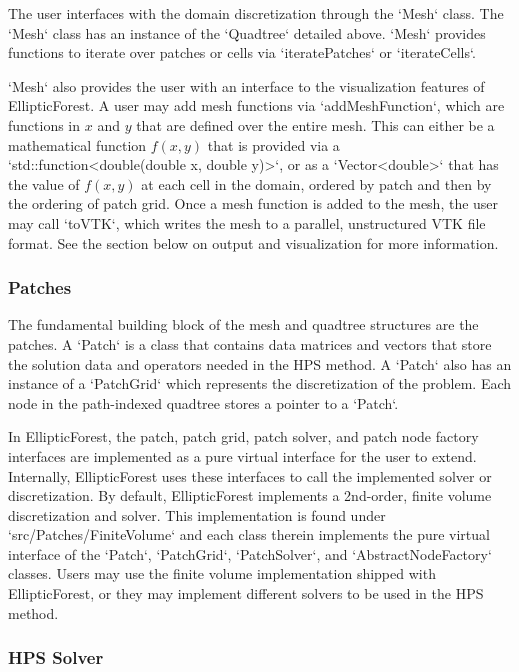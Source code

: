 The user interfaces with the domain discretization through the `Mesh` class. The `Mesh` class has an instance of the `Quadtree` detailed above. `Mesh` provides functions to iterate over patches or cells via `iteratePatches` or `iterateCells`.

`Mesh` also provides the user with an interface to the visualization features of EllipticForest. A user may add mesh functions via `addMeshFunction`, which are functions in $x$ and $y$ that are defined over the entire mesh. This can either be a mathematical function $f(x,y)$ that is provided via a `std::function<double(double x, double y)>`, or as a `Vector<double>` that has the value of $f(x,y)$ at each cell in the domain, ordered by patch and then by the ordering of patch grid. Once a mesh function is added to the mesh, the user may call `toVTK`, which writes the mesh to a parallel, unstructured VTK file format. See the section below on output and visualization for more information.

\subsubsection{Patches}

The fundamental building block of the mesh and quadtree structures are the patches. A `Patch` is a class that contains data matrices and vectors that store the solution data and operators needed in the HPS method. A `Patch` also has an instance of a `PatchGrid` which represents the discretization of the problem. Each node in the path-indexed quadtree stores a pointer to a `Patch`.

In EllipticForest, the patch, patch grid, patch solver, and patch node factory interfaces are implemented as a pure virtual interface for the user to extend. Internally, EllipticForest uses these interfaces to call the implemented solver or discretization. By default, EllipticForest implements a 2nd-order, finite volume discretization and solver. This implementation is found under `src/Patches/FiniteVolume` and each class therein implements the pure virtual interface of the `Patch`, `PatchGrid`, `PatchSolver`, and `AbstractNodeFactory` classes. Users may use the finite volume implementation shipped with EllipticForest, or they may implement different solvers to be used in the HPS method.

\subsubsection{HPS Solver}

